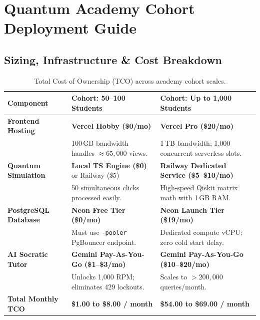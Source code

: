 \documentclass[11pt, a4paper]{article}
\begin{document}
\section{Quantum Academy Cohort Deployment Guide}

\subsection{Sizing, Infrastructure \& Cost Breakdown}

\begin{table}[h!]
\centering
\small
\begin{tabularx}{\textwidth}{l X X}
\toprule
\textbf{Component} & \textbf{Cohort: 50--100 Students} & \textbf{Cohort: Up to 1,000 Students} \\
\midrule
\textbf{Frontend Hosting} & \textbf{Vercel Hobby (\$0/mo)} & \textbf{Vercel Pro (\$20/mo)} \\
& 100\,GB bandwidth handles $\approx 65,000$ views. & 1\,TB bandwidth; 1,000 concurrent serverless slots. \\
\addlinespace
\textbf{Quantum Simulation} & \textbf{Local TS Engine (\$0)} or Railway (\$5) & \textbf{Railway Dedicated Service (\$5--\$10/mo)} \\
& 50 simultaneous clicks processed easily. & High-speed Qiskit matrix math with 1\,GB RAM. \\
\addlinespace
\textbf{PostgreSQL Database} & \textbf{Neon Free Tier (\$0/mo)} & \textbf{Neon Launch Tier (\$19/mo)} \\
& Must use \texttt{-pooler} PgBouncer endpoint. & Dedicated compute vCPU; zero cold start delay. \\
\addlinespace
\textbf{AI Socratic Tutor} & \textbf{Gemini Pay-As-You-Go (\$1--\$3/mo)} & \textbf{Gemini Pay-As-You-Go (\$10--\$20/mo)} \\
& Unlocks 1,000 RPM; eliminates 429 lockouts. & Scales to $>200,000$ queries/month. \\
\midrule
\textbf{Total Monthly TCO} & \textbf{\$1.00 to \$8.00 / month} & \textbf{\$54.00 to \$69.00 / month} \\
\bottomrule
\end{tabularx}
\caption{Total Cost of Ownership (TCO) across academy cohort scales.}
\label{tab:academy_tco}
\end{table}
\end{document}
